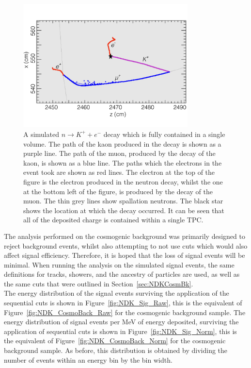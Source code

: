 \begin{figure}
  \centering
  \includegraphics[width=0.8\textwidth]{FullyContained}
  \caption[A simulated $n \rightarrow K^{+} + e^{-}$ decay which is fully contained in a single TPC volume]
          {A simulated $n \rightarrow K^{+} + e^{-}$ decay which is fully contained in a single volume. The path of the kaon produced in the decay is shown as a purple line. The path of the muon, produced by the decay of the kaon, is shown as a blue line. The paths which the electrons in the event took are shown as red lines. The electron at the top of the figure is the electron produced in the neutron decay, whilst the one at the bottom left of the figure, is produced by the decay of the muon. The thin grey lines show spallation neutrons. The black star shows the location at which the decay occurred. It can be seen that all of the deposited charge is contained within a single TPC.}
  \label{fig:NDK_Sig_Cont}
\end{figure}

The analysis performed on the cosmogenic background was primarily designed to reject background events, whilst also attempting to not use cuts which would also affect signal efficiency. Therefore, it is hoped that the loss of signal events will be minimal. When running the analysis on the simulated signal events, the same definitions for tracks, showers, and the ancestry of particles are used, as well as the same cuts that were outlined in Section~\ref{sec:NDKCosmBk}. \\

The energy distribution of the signal events surviving the application of the sequential cuts is shown in Figure~\ref{fig:NDK_Sig_Raw}, this is the equivalent of Figure~\ref{fig:NDK_CosmoBack_Raw} for the cosmogenic background sample. The energy distribution of signal events per MeV of energy deposited, surviving the application of sequential cuts is shown in Figure~\ref{fig:NDK_Sig_Norm}, this is the equivalent of Figure~\ref{fig:NDK_CosmoBack_Norm} for the cosmogenic background sample. As before, this distribution is obtained by dividing the number of events within an energy bin by the bin width. \\


